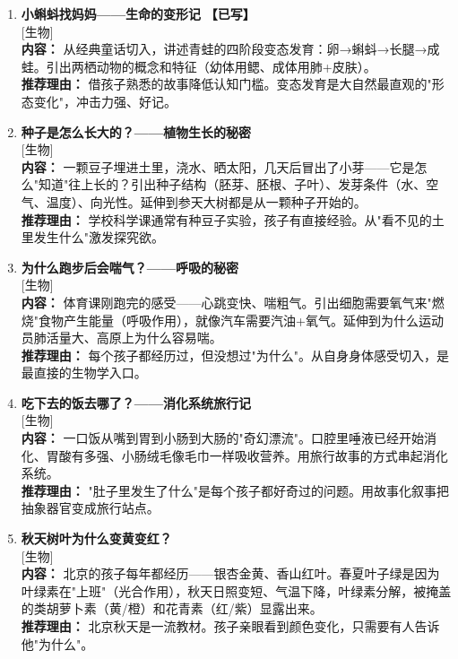 \documentclass[a4paper,12pt]{ctexart}
\newcommand{\tagbiology}{\textcolor{biology}{\small [生物]}}
\newcommand{\done}{\textcolor{donegreen}{\textbf{【已写】}}}
\begin{document}
\begin{enumerate}

\item[\textbf{第4课}] \textbf{小蝌蚪找妈妈——生命的变形记} \done \\
\tagbiology \\
\textbf{内容：} 从经典童话切入，讲述青蛙的四阶段变态发育：卵→蝌蚪→长腿→成蛙。引出两栖动物的概念和特征（幼体用鳃、成体用肺+皮肤）。\\
\textbf{推荐理由：} 借孩子熟悉的故事降低认知门槛。变态发育是大自然最直观的"形态变化"，冲击力强、好记。

\item[\textbf{第5课}] \textbf{种子是怎么长大的？——植物生长的秘密} \\
\tagbiology \\
\textbf{内容：} 一颗豆子埋进土里，浇水、晒太阳，几天后冒出了小芽——它是怎么"知道"往上长的？引出种子结构（胚芽、胚根、子叶）、发芽条件（水、空气、温度）、向光性。延伸到参天大树都是从一颗种子开始的。\\
\textbf{推荐理由：} 学校科学课通常有种豆子实验，孩子有直接经验。从"看不见的土里发生什么"激发探究欲。

\item[\textbf{第6课}] \textbf{为什么跑步后会喘气？——呼吸的秘密} \\
\tagbiology \\
\textbf{内容：} 体育课刚跑完的感受——心跳变快、喘粗气。引出细胞需要氧气来"燃烧"食物产生能量（呼吸作用），就像汽车需要汽油+氧气。延伸到为什么运动员肺活量大、高原上为什么容易喘。\\
\textbf{推荐理由：} 每个孩子都经历过，但没想过"为什么"。从自身身体感受切入，是最直接的生物学入口。

\item[\textbf{第7课}] \textbf{吃下去的饭去哪了？——消化系统旅行记} \\
\tagbiology \\
\textbf{内容：} 一口饭从嘴到胃到小肠到大肠的"奇幻漂流"。口腔里唾液已经开始消化、胃酸有多强、小肠绒毛像毛巾一样吸收营养。用旅行故事的方式串起消化系统。\\
\textbf{推荐理由：} "肚子里发生了什么"是每个孩子都好奇过的问题。用故事化叙事把抽象器官变成旅行站点。

\item[\textbf{第8课}] \textbf{秋天树叶为什么变黄变红？} \\
\tagbiology \\
\textbf{内容：} 北京的孩子每年都经历——银杏金黄、香山红叶。春夏叶子绿是因为叶绿素在"上班"（光合作用），秋天日照变短、气温下降，叶绿素分解，被掩盖的类胡萝卜素（黄/橙）和花青素（红/紫）显露出来。\\
\textbf{推荐理由：} 北京秋天是一流教材。孩子亲眼看到颜色变化，只需要有人告诉他"为什么"。


\end{enumerate}
\end{document}
